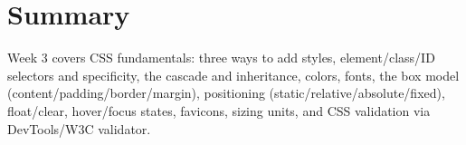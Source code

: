 \documentclass[12pt]{article}
\begin{document}
\section{Summary}
Week 3 covers CSS fundamentals: three ways to add styles, element/class/ID selectors and specificity, the cascade and inheritance, colors, fonts, the box model (content/padding/border/margin), positioning (static/relative/absolute/fixed), float/clear, hover/focus states, favicons, sizing units, and CSS validation via DevTools/W3C validator.
\end{document}
